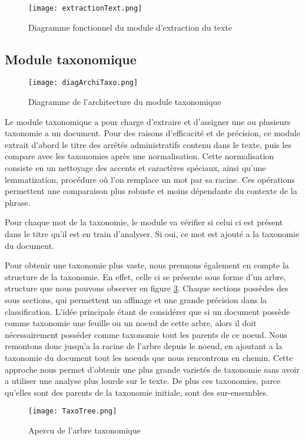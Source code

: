 \begin{figure}[h!]
  \centering
	\texttt{[image: extractionText.png]}
	\caption[]{Diagramme fonctionnel du module d'extraction du texte}
  \label{}
\end{figure}


\subsection{Module taxonomique}

\begin{figure}[h!]
  \centering
  \texttt{[image: diagArchiTaxo.png]}
	\caption[]{Diagramme de l'architecture du module taxonomique}
  \label{}
\end{figure}


Le module taxonomique a pour charge d'extraire et d'assigner une ou plusieurs taxonomie a un document. Pour des raisons d'efficacité et de précision, ce module extrait d'abord le titre des arrêtés administratifs contenu dans le texte, puis les compare avec les taxonomies après une normalisation. Cette normalisation consiste en un nettoyage des accents et caractères spéciaux, ainsi qu'une lemmatization, procédure où l'on remplace un mot par sa racine. Ces opérations permettent une comparaison plus robuste et moins dépendante du contexte de la phrase. 

Pour chaque mot de la taxonomie, le module va vérifier si celui ci est présent dans le titre qu'il est en train d'analyser. Si oui, ce mot est ajouté a la taxonomie du document.

Pour obtenir une taxonomie plus vaste, nous prennons également en compte la structure de la taxonomie. En effet, celle ci se présente sous forme d'un arbre, structure que nous pouvons observer en figure \ref{fig:tree}. Chaque sections possèdes des sous sections, qui permettent un affinage et une grande précision dans la classification. L'idée principale étant de considérer que si un document possède comme taxonomie une feuille ou un noeud de cette arbre, alors il doit nécessairement posséder comme taxonomie tout les parents de ce noeud. Nous remontons donc jusqu'a la racine de l'arbre depuis le noeud, en ajoutant a la taxonomie du document tout les noeuds que nous rencontrons en chemin. Cette approche nous permet d'obtenir une plus grande varietés de taxonomie sans avoir a utiliser une analyse plus lourde sur le texte. De plus ces taxonomies, parce qu'elles sont des parents de la taxonomie initiale, sont des sur-ensembles.
\begin{figure}[h!]
  \centering
  \texttt{[image: TaxoTree.png]}
	\caption[]{Apercu de l'arbre taxonomique}
  \label{fig:tree}
\end{figure}

